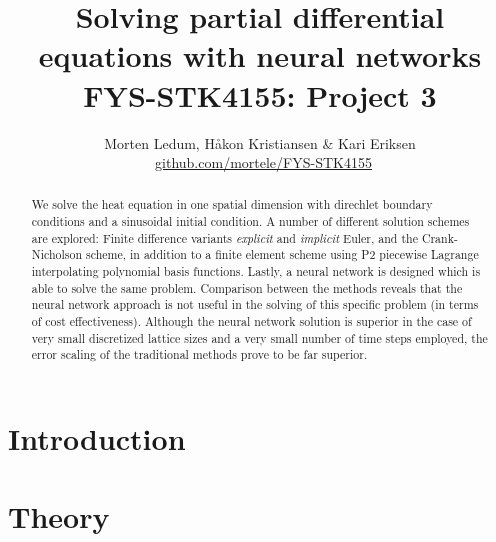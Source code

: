 \documentclass[a4paper, twocolumn]{article}
\title{{\sc Solving partial differential equations with neural networks \\ {\large FYS-STK4155: Project 3}}}
\author{Morten Ledum, Håkon Kristiansen \& Kari Eriksen \\ \faGithub \ {\small \href{https://github.com/mortele/FYS-STK4155/tree/master/project3}{github.com/mortele/FYS-STK4155}}}
\begin{document}
\onecolumn
\maketitle

\begin{abstract}
We solve the heat equation in one spatial dimension with direchlet boundary conditions and a sinusoidal initial condition. A number of different solution schemes are explored: Finite difference variants \textit{explicit} and \textit{implicit} Euler, and the Crank-Nicholson scheme, in addition to a finite element scheme using P2 piecewise Lagrange interpolating polynomial basis functions. Lastly, a neural network is designed which is able to solve the same problem. Comparison between the methods reveals that the neural network approach is not useful in the solving of this specific problem (in terms of cost effectiveness). Although the neural network solution is superior in the case of very small discretized lattice sizes and a very small number of time steps employed, the error scaling of the traditional methods prove to be far superior. 
\end{abstract}

\twocolumn
\onecolumn

\tableofcontents 
\twocolumn


\section{Introduction}
\lipsum[1]

\section{Theory}
\end{document}
